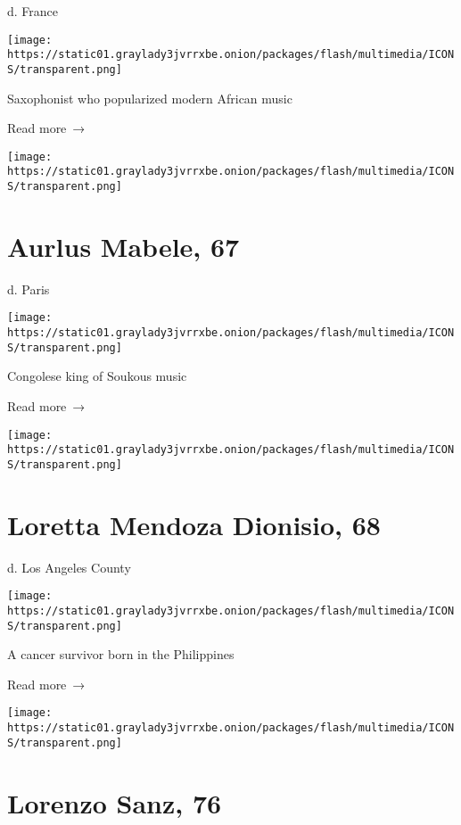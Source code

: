 d. France

\texttt{[image: https://static01.graylady3jvrrxbe.onion/packages/flash/multimedia/ICONS/transparent.png]}

Saxophonist who popularized modern African music

 Read more~→

\href{https://www.nytimes3xbfgragh.onion/2020/03/23/world/africa/aurlus-mabele-dead-coronavirus.html}{}

\texttt{[image: https://static01.graylady3jvrrxbe.onion/packages/flash/multimedia/ICONS/transparent.png]}

\hypertarget{aurlus-mabele-67}{%
\section{Aurlus Mabele, 67}\label{aurlus-mabele-67}}

d. Paris

\texttt{[image: https://static01.graylady3jvrrxbe.onion/packages/flash/multimedia/ICONS/transparent.png]}

Congolese king of Soukous music

 Read more~→

\href{https://www.nytimes3xbfgragh.onion/2020/03/22/us/coronavirus-deaths-united-states.html}{}

\texttt{[image: https://static01.graylady3jvrrxbe.onion/packages/flash/multimedia/ICONS/transparent.png]}

\hypertarget{loretta-mendoza-dionisio-68}{%
\section{Loretta Mendoza Dionisio,
68}\label{loretta-mendoza-dionisio-68}}

d. Los Angeles County

\texttt{[image: https://static01.graylady3jvrrxbe.onion/packages/flash/multimedia/ICONS/transparent.png]}

A cancer survivor born in the Philippines

 Read more~→

\href{https://www.nytimes3xbfgragh.onion/2020/03/22/obituaries/lorenzo-sanz-dead.html}{}

\texttt{[image: https://static01.graylady3jvrrxbe.onion/packages/flash/multimedia/ICONS/transparent.png]}

\hypertarget{lorenzo-sanz-76}{%
\section{Lorenzo Sanz, 76}\label{lorenzo-sanz-76}}


